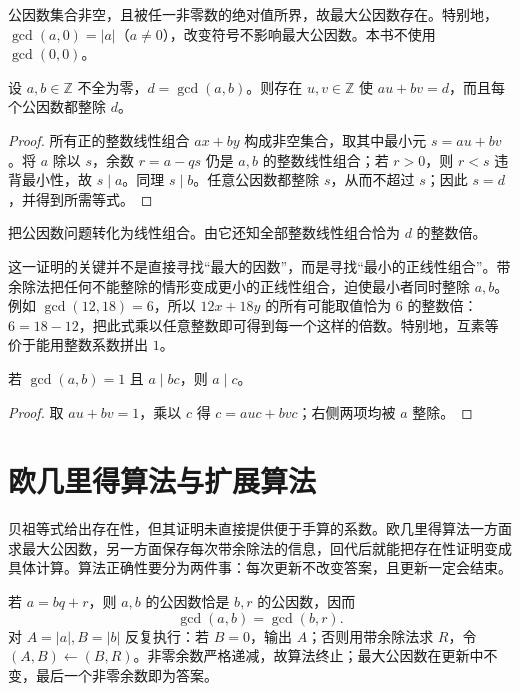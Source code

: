 \documentclass[UTF8,12pt,a4paper,fontset=fandol]{ctexbook}
\begin{document}
公因数集合非空，且被任一非零数的绝对值所界，故最大公因数存在。特别地，$\gcd(a,0)=|a|$（$a\ne0$），改变符号不影响最大公因数。本书不使用 $\gcd(0,0)$。

\begin{theorem}[贝祖等式]
\label{thm:bezout}
设 $a,b\in\mathbb Z$ 不全为零，$d=\gcd(a,b)$。则存在 $u,v\in\mathbb Z$ 使 $au+bv=d$，而且每个公因数都整除 $d$。
\end{theorem}
\begin{proof}
所有正的整数线性组合 $ax+by$ 构成非空集合，取其中最小元 $s=au+bv$。将 $a$ 除以 $s$，余数 $r=a-qs$ 仍是 $a,b$ 的整数线性组合；若 $r>0$，则 $r<s$ 违背最小性，故 $s\mid a$。同理 $s\mid b$。任意公因数都整除 $s$，从而不超过 $s$；因此 $s=d$，并得到所需等式。
\end{proof}

把公因数问题转化为线性组合。由它还知全部整数线性组合恰为 $d$ 的整数倍。

这一证明的关键并不是直接寻找“最大的因数”，而是寻找“最小的正线性组合”。带余除法把任何不能整除的情形变成更小的正线性组合，迫使最小者同时整除 $a,b$。例如 $\gcd(12,18)=6$，所以 $12x+18y$ 的所有可能取值恰为 $6$ 的整数倍：$6=18-12$，把此式乘以任意整数即可得到每一个这样的倍数。特别地，互素等价于能用整数系数拼出 $1$。

\begin{corollary}[互素消去]
\label{cor:coprime-cancellation}
若 $\gcd(a,b)=1$ 且 $a\mid bc$，则 $a\mid c$。
\end{corollary}
\begin{proof}
取 $au+bv=1$，乘以 $c$ 得 $c=auc+bvc$；右侧两项均被 $a$ 整除。
\end{proof}

\section{欧几里得算法与扩展算法}

贝祖等式给出存在性，但其证明未直接提供便于手算的系数。欧几里得算法一方面求最大公因数，另一方面保存每次带余除法的信息，回代后就能把存在性证明变成具体计算。算法正确性要分为两件事：每次更新不改变答案，且更新一定会结束。

若 $a=bq+r$，则 $a,b$ 的公因数恰是 $b,r$ 的公因数，因而
\[
  \gcd(a,b)=\gcd(b,r).
\]
对 $A=|a|,B=|b|$ 反复执行：若 $B=0$，输出 $A$；否则用带余除法求 $R$，令 $(A,B)\leftarrow(B,R)$。非零余数严格递减，故算法终止；最大公因数在更新中不变，最后一个非零余数即为答案。
\end{document}
